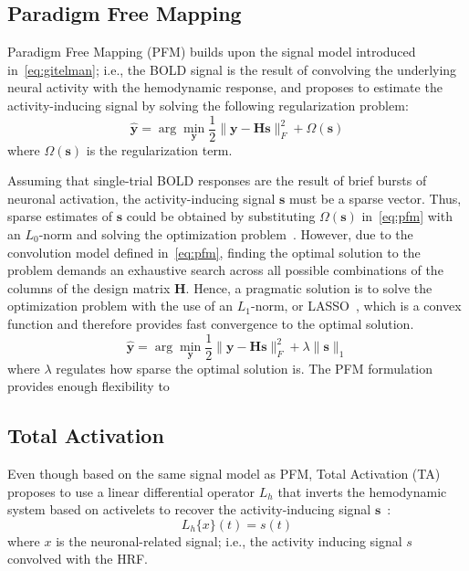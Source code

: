 \subsection{Paradigm Free Mapping}

Paradigm Free Mapping (PFM) builds upon the signal model introduced in~\eqref{eq:gitelman}; i.e., the BOLD signal is the result of convolving the underlying neural activity with the hemodynamic response, and proposes to estimate the activity-inducing signal by solving the following regularization problem:
\begin{equation}
    \label{eq:pfm}
    \hat{\mathbf{y}} = \arg \min_{\mathbf{y}} \frac{1}{2} \| \mathbf{y} - \mathbf{Hs} \|_F^2 + \Omega(\mathbf{s})
\end{equation}
where \(\Omega(\mathbf{s})\) is the regularization term.

Assuming that single-trial BOLD responses are the result of brief bursts of neuronal activation, the activity-inducing signal \(\mathbf{s}\) must be a sparse vector. Thus, sparse estimates of \(\mathbf{s}\) could be obtained by substituting \(\Omega(\mathbf{s})\) in~\eqref{eq:pfm} with an \(L_0\)-norm and solving the optimization problem~\cite{bruckstein2009sparse}. However, due to the convolution model defined in~\eqref{eq:pfm}, finding the optimal solution to the problem demands an exhaustive search across all possible combinations of the columns of the design matrix \(\mathbf{H}\). Hence, a pragmatic solution is to solve the optimization problem with the use of an \(L_1\)-norm, or LASSO~\cite{tibshirani1996regression}, which is a convex function and therefore provides fast convergence to the optimal solution.
\begin{equation}
    \label{eq:pfm}
    \hat{\mathbf{y}} = \arg \min_{\mathbf{y}} \frac{1}{2} \| \mathbf{y} - \mathbf{Hs} \|_F^2 + \lambda \| \mathbf{s} \|_1
\end{equation}
where \(\lambda\) regulates how sparse the optimal solution is.
The PFM formulation provides enough flexibility to 

\subsection{Total Activation}
Even though based on the same signal model as PFM, Total Activation (TA) proposes to use a linear differential operator \(L_h\) that inverts the hemodynamic system based on activelets to recover the activity-inducing signal \(\mathbf{s}\)~\cite{khalidov2011activelets}:
\begin{equation}
    L_h\{x\}(t) = s(t)
\end{equation}
where \(x\) is the neuronal-related signal; i.e., the activity inducing signal \(s\) convolved with the HRF.

